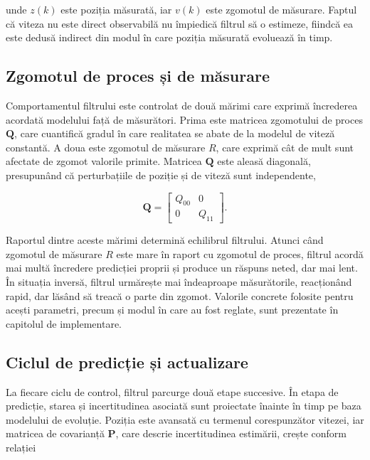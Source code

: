 unde $z(k)$ este poziția măsurată, iar $v(k)$ este zgomotul de măsurare. Faptul că
viteza nu este direct observabilă nu împiedică filtrul să o estimeze, fiindcă ea
este dedusă indirect din modul în care poziția măsurată evoluează în timp.

\subsection{Zgomotul de proces și de măsurare}

Comportamentul filtrului este controlat de două mărimi care exprimă încrederea
acordată modelului față de măsurători. Prima este matricea zgomotului de proces
$\mathbf{Q}$, care cuantifică gradul în care realitatea se abate de la modelul de
viteză constantă. A doua este zgomotul de măsurare $R$, care exprimă cât de mult
sunt afectate de zgomot valorile primite. Matricea $\mathbf{Q}$ este aleasă
diagonală, presupunând că perturbațiile de poziție și de viteză sunt
independente,

\begin{equation}
\label{eq:kalman-Q}
\mathbf{Q} =
\begin{bmatrix} Q_{00} & 0 \\ 0 & Q_{11} \end{bmatrix} .
\end{equation}

Raportul dintre aceste mărimi determină echilibrul filtrului. Atunci când zgomotul
de măsurare $R$ este mare în raport cu zgomotul de proces, filtrul acordă mai multă
încredere predicției proprii și produce un răspuns neted, dar mai lent. În situația
inversă, filtrul urmărește mai îndeaproape măsurătorile, reacționând rapid, dar
lăsând să treacă o parte din zgomot. Valorile concrete folosite pentru acești
parametri, precum și modul în care au fost reglate, sunt prezentate în capitolul de
implementare.

\subsection{Ciclul de predicție și actualizare}

La fiecare ciclu de control, filtrul parcurge două etape succesive. În etapa de
predicție, starea și incertitudinea asociată sunt proiectate înainte în timp pe
baza modelului de evoluție. Poziția este avansată cu termenul corespunzător
vitezei, iar matricea de covarianță $\mathbf{P}$, care descrie incertitudinea
estimării, crește conform relației

